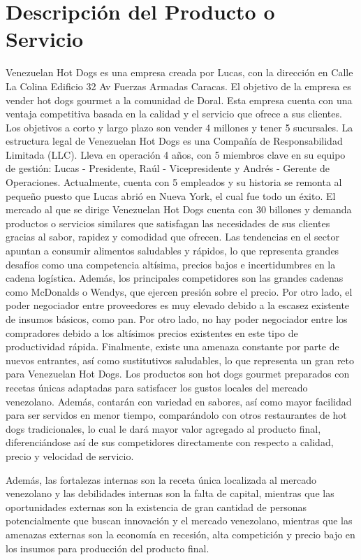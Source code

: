 \section{Descripción del Producto o Servicio} \label{sec:descripcion_producto}Venezuelan Hot Dogs es una empresa creada por Lucas, con la dirección en Calle La Colina Edificio 32 Av Fuerzas Armadas Caracas. El objetivo de la empresa es vender hot dogs gourmet a la comunidad de Doral. Esta empresa cuenta con una ventaja competitiva basada en la calidad y el servicio que ofrece a sus clientes. Los objetivos a corto y largo plazo son vender 4 millones y tener 5 sucursales.
La estructura legal de Venezuelan Hot Dogs es una Compañía de Responsabilidad Limitada (LLC). Lleva en operación 4 años, con 5 miembros clave en su equipo de gestión: Lucas - Presidente, Raúl - Vicepresidente y Andrés - Gerente de Operaciones. Actualmente, cuenta con 5 empleados y su historia se remonta al pequeño puesto que Lucas abrió en Nueva York, el cual fue todo un éxito.
El mercado al que se dirige Venezuelan Hot Dogs cuenta con 30 billones y demanda productos o servicios similares que satisfagan las necesidades de sus clientes gracias al sabor, rapidez y comodidad que ofrecen. Las tendencias en el sector apuntan a consumir alimentos saludables y rápidos, lo que representa grandes desafíos como una competencia altísima, precios bajos e incertidumbres en la cadena logística. Además, los principales competidores son las grandes cadenas como McDonalds o Wendys, que ejercen presión sobre el precio. Por otro lado, el poder negociador entre proveedores es muy elevado debido a la escasez existente de insumos básicos, como pan. Por otro lado, no hay poder negociador entre los compradores debido a los altísimos precios existentes en este tipo de productividad rápida. Finalmente, existe una amenaza constante por parte de nuevos entrantes, así como sustitutivos saludables, lo que representa un gran reto para Venezuelan Hot Dogs.
Los productos son hot dogs gourmet preparados con recetas únicas adaptadas para satisfacer los gustos locales del mercado venezolano. Además, contarán con variedad en sabores, así como mayor facilidad para ser servidos en menor tiempo, comparándolo con otros restaurantes de hot dogs tradicionales, lo cual le dará mayor valor agregado al producto final, diferenciándose así de sus competidores directamente con respecto a calidad, precio y velocidad de servicio. 

Además, las fortalezas internas son la receta única localizada al mercado venezolano y las debilidades internas son la falta de capital, mientras que las oportunidades externas son la existencia de gran cantidad de personas potencialmente que buscan innovación y el mercado venezolano, mientras que las amenazas externas son la economía en recesión, alta competición y precio bajo en los insumos para producción del producto final. 

